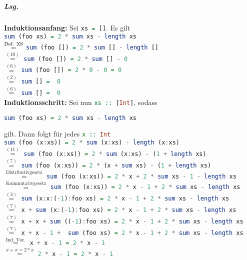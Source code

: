 \documentclass{scrreprt}
\begin{document}
\subparagraph{Lsg.} \textbf{Induktionsanfang:} Sei \lstinline[language=Haskell]{xs = []}.
Es gilt \\
\lstinline[language=Haskell]{sum (foo xs) = 2 * sum xs - length xs} \\
$\overset{\text{Def. }\lstinline[language=Haskell]{xs}}=$
\lstinline[language=Haskell]{sum (foo []) = 2 * sum [] - length []} \\
$\overset{(10)}=$
\lstinline[language=Haskell]{sum (foo []) = 2 * sum [] - 0} \\
$\overset{(6)}=$
\lstinline[language=Haskell]{sum (foo []) = 2 * 0 - 0 = 0} \\
$\overset{(2)}=$
\lstinline[language=Haskell]{sum [] =  0} \\
$\overset{(6)}=$
\lstinline[language=Haskell]{sum [] =  0} \\
\noindent
\textbf{Induktionsschritt:} Sei nun \lstinline[language=Haskell]{xs :: [Int]},
sodass
\begin{lstlisting}[language=Haskell]
  sum (foo xs) = 2 * sum xs - length xs
\end{lstlisting}
gilt.
Dann folgt für jedes \lstinline[language=Haskell]{x :: Int} \\
\lstinline[language=Haskell]{sum (foo (x:xs)) = 2 * sum (x:xs) - length (x:xs)} \\
$\overset{(11)}=$
\lstinline[language=Haskell]{sum (foo (x:xs)) = 2 * sum (x:xs) - (1 + length xs)} \\
$\overset{(7)}=$
\lstinline[language=Haskell]{sum (foo (x:xs)) = 2 * (x + sum xs) - (1 + length xs)} \\
$\overset{\text{Distributivgesetz}}=$
\lstinline[language=Haskell]{sum (foo (x:xs)) = 2 * x + 2 * sum xs - 1 - length xs} \\
$\overset{\text{Kommutativgesetz}}=$
\lstinline[language=Haskell]{sum (foo (x:xs)) = 2 * x - 1 + 2 * sum xs - length xs} \\
$\overset{(3)}=$
\lstinline[language=Haskell]{sum (x:x:(-1):foo xs) = 2 * x - 1 + 2 * sum xs - length xs} \\
$\overset{(7)}=$
\lstinline[language=Haskell]{x + sum (x:(-1):foo xs) = 2 * x - 1 + 2 * sum xs - length xs} \\
$\overset{(7)}=$
\lstinline[language=Haskell]{x + x + sum ((-1):foo xs) = 2 * x - 1 + 2 * sum xs - length xs} \\
$\overset{(7)}=$
\lstinline[language=Haskell]{x + x - 1 +  sum (foo xs) = 2 * x - 1 + 2 * sum xs - length xs} \\
$\overset{\text{Ind. Vor.}}=$
\lstinline[language=Haskell]{x + x - 1 = 2 * x - 1} \\
$\overset{x + x = 2 * x}=$
\lstinline[language=Haskell]{2 * x - 1 = 2 * x - 1} \\
\end{document}
